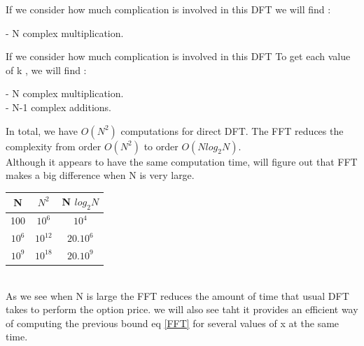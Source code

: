 \documentclass[12pt]{report}
\begin{document}
If we consider how much complication is involved in this DFT we will find :

- N complex multiplication.



If we consider how much complication is involved in this DFT To get each value of k , we will find :

- N complex multiplication.\\
- N-1 complex additions. 


In total, we have $O(N^2)$ computations for direct DFT. The FFT reduces the complexity from order  $O(N^2)$ to order $O(N log_2N)$.\\
 Although it appears to  have the same computation time, will figure out that FFT makes  a big difference when N is very large.
 \\

 \begin{tabular}{||c c c ||} 
 \hline
N & $N^2$ & N $log_2 N$ \\ [0.5ex] 
 \hline\hline
 100 & $10^6$ & $10^4$ \\ 
 \hline
 $10^6$ & $10^{12}$ & $20.10^6$ \\
 \hline
 $10^9$ & $10^{18}$ & $20.10^9$  \\
 \hline
 
\end{tabular}
\\


 As we see when N is large the FFT reduces the amount of time that usual DFT takes to perform the option price. we will also see taht it provides an efficient way of computing the previous bound eq \eqref{FFT} for several values of x at the same time.

 
\end{document}
